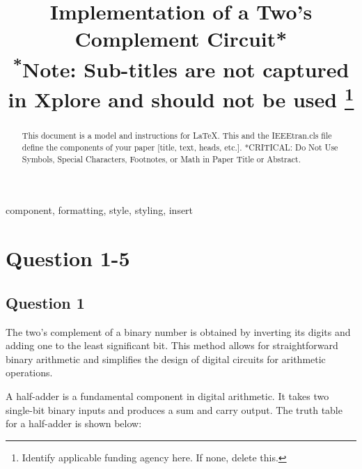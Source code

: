\documentclass[conference]{IEEEtran}
\begin{document}
\title{Implementation of a Two's Complement Circuit*\\
{\footnotesize \textsuperscript{*}Note: Sub-titles are not captured in Xplore and
should not be used}
\thanks{Identify applicable funding agency here. If none, delete this.}
}

\author{
\and
{}
}

\maketitle

\begin{abstract}
This document is a model and instructions for \LaTeX.
This and the IEEEtran.cls file define the components of your paper [title, text, heads, etc.]. *CRITICAL: Do Not Use Symbols, Special Characters, Footnotes, 
or Math in Paper Title or Abstract.
\end{abstract}

\begin{IEEEkeywords}
component, formatting, style, styling, insert
\end{IEEEkeywords}


\section{Question 1-5}

\subsection{Question 1}

The two's complement of a binary number is obtained by inverting its digits and adding one to the least significant bit. This method allows for straightforward binary arithmetic and simplifies the design of digital circuits for arithmetic operations.

A half-adder is a fundamental component in digital arithmetic. It takes two single-bit binary inputs and produces a sum and carry output. The truth table for a half-adder is shown below:
\end{document}
